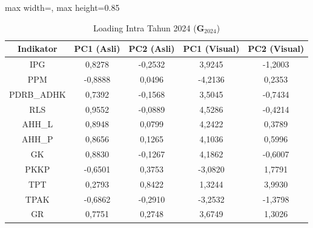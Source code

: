\begin{table}[H]
\centering
\caption{Loading Intra Tahun 2024 ($\mathbf{G}_{2024}$)} \label{tab:app1loading_intra_2024}
\begin{adjustbox}{max width=\textwidth, max height=0.85\textheight}
\begin{tabular}{|c|c|c|c|c|}
\hline
\textbf{Indikator} & \textbf{PC1 (Asli)} & \textbf{PC2 (Asli)} & \textbf{PC1 (Visual)} & \textbf{PC2 (Visual)} \\
\hline
IPG & 0,8278 & -0,2532 & 3,9245 & -1,2003 \\
PPM & -0,8888 & 0,0496 & -4,2136 & 0,2353 \\
PDRB\_ADHK & 0,7392 & -0,1568 & 3,5045 & -0,7434 \\
RLS & 0,9552 & -0,0889 & 4,5286 & -0,4214 \\
AHH\_L & 0,8948 & 0,0799 & 4,2422 & 0,3789 \\
AHH\_P & 0,8656 & 0,1265 & 4,1036 & 0,5996 \\
GK & 0,8830 & -0,1267 & 4,1862 & -0,6007 \\
PKKP & -0,6501 & 0,3753 & -3,0820 & 1,7791 \\
TPT & 0,2793 & 0,8422 & 1,3244 & 3,9930 \\
TPAK & -0,6862 & -0,2910 & -3,2532 & -1,3798 \\
GR & 0,7751 & 0,2748 & 3,6749 & 1,3026 \\
\hline
\end{tabular}
\end{adjustbox}
\end{table}